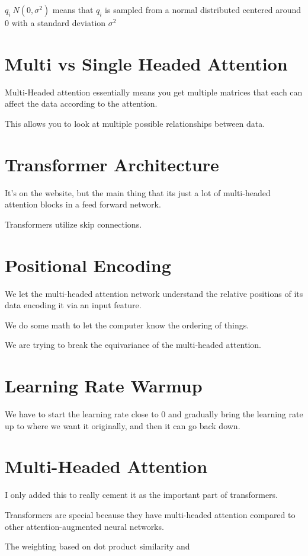 \documentclass[fleqn]{report}
\begin{document}
$q_i ~ N(0, \sigma^2)$ means that $q_i$ is sampled from a normal 
distributed centered around 0 with a standard deviation $\sigma^2$

\section{Multi vs Single Headed Attention}
Multi-Headed attention essentially means you get multiple matrices that each 
can affect the data according to the attention. 

This allows you to look at multiple possible relationships between data. 

\section{Transformer Architecture}
It's on the website, but the main thing that its just a lot of multi-headed 
attention blocks in a feed forward network. 

Transformers utilize skip connections. 

\section{Positional Encoding}
We let the multi-headed attention network understand the relative positions of 
its data encoding it via an input feature.

We do some math to let the computer know the ordering of things.

We are trying to break the equivariance of the multi-headed attention. 

\section{Learning Rate Warmup}
We have to start the learning rate close to 0 and gradually bring the learning 
rate up to where we want it originally, and then it can go back down. 

\section{Multi-Headed Attention}
I only added this to really cement it as the important part of transformers.

Transformers are special because they have multi-headed attention compared 
to other attention-augmented neural networks.

The weighting based on dot product similarity and 
\end{document}
